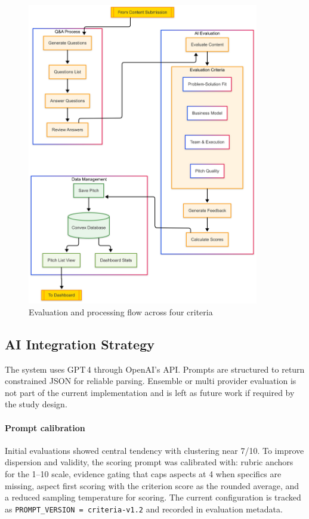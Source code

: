 \begin{figure}[H]
  \centering
  \includegraphics[width=0.9\textwidth]{img/eval-flow}
  \caption{Evaluation and processing flow across four criteria}
  \label{fig:eval-flow}
\end{figure}

\subsection{AI Integration Strategy}\label{subsec:ai-integration-strategy}
The system uses GPT\,4 through OpenAI's API. Prompts are structured to return constrained JSON for reliable parsing. Ensemble or multi provider evaluation is not part of the current implementation and is left as future work if required by the study design.

\paragraph{Prompt calibration} Initial evaluations showed central tendency with clustering near 7/10. To improve dispersion and validity, the scoring prompt was calibrated with: rubric anchors for the 1--10 scale, evidence gating that caps aspects at 4 when specifics are missing, aspect first scoring with the criterion score as the rounded average, and a reduced sampling temperature for scoring. The current configuration is tracked as \texttt{PROMPT\_VERSION = criteria\textrm{-}v1.2} and recorded in evaluation metadata.

